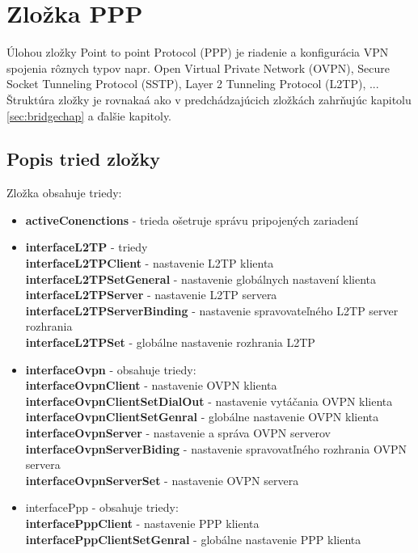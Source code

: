 \section{Zložka PPP}
Úlohou zložky Point to point Protocol (PPP) je riadenie  a konfigurácia VPN spojenia rôznych typov napr. Open Virtual Private Network (OVPN), Secure Socket Tunneling Protocol (SSTP), Layer 2 Tunneling Protocol (L2TP), ... Štruktúra zložky je rovnakaá ako v predchádzajúcich zložkách zahrňujúc kapitolu \ref{sec:bridgechap} a ďalšie kapitoly.
\subsection{Popis tried zložky}
Zložka obsahuje triedy:
\begin{itemize}
\item \textbf{activeConenctions} - trieda ošetruje  správu pripojených zariadení
\item \textbf{interfaceL2TP} - triedy\\
\textbf{interfaceL2TPClient} - nastavenie L2TP klienta\\
\textbf{interfaceL2TPSetGeneral} - nastavenie  globálnych nastavení klienta\\
\textbf{interfaceL2TPServer} - nastavenie L2TP servera\\
\textbf{interfaceL2TPServerBinding} - nastavenie spravovateľného L2TP server rozhrania\\
\textbf{interfaceL2TPSet} - globálne nastavenie rozhrania L2TP
\item \textbf{interfaceOvpn} - obsahuje triedy:\\
\textbf{interfaceOvpnClient} - nastavenie OVPN klienta\\
\textbf{interfaceOvpnClientSetDialOut} - nastavenie vytáčania OVPN klienta\\
\textbf{interfaceOvpnClientSetGenral} - globálne nastavenie OVPN klienta\\
\textbf{interfaceOvpnServer} - nastavenie a správa OVPN serverov\\
\textbf{interfaceOvpnServerBiding} - nastavenie spravovatľného rozhrania OVPN servera\\
\textbf{interfaceOvpnServerSet} - nastavenie OVPN servera
\item interfacePpp - obsahuje triedy:\\
\textbf{interfacePppClient} - nastavenie PPP klienta\\
\textbf{interfacePppClientSetGenral} - globálne nastavenie PPP klienta\\

\end{itemize}
